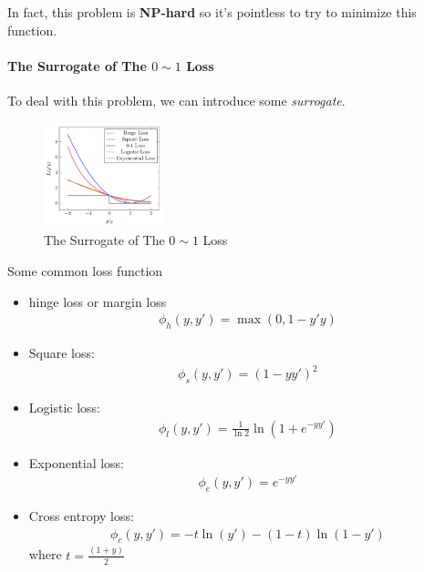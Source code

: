 In fact, this problem is \textbf{NP-hard} so it's pointless to try to minimize this function. 

\paragraph{The Surrogate of The \texorpdfstring{$0\sim 1$}. Loss}To deal with this problem, we can introduce some \textit{surrogate}. 

\begin{figure}[!htb]
    \centering
    \includegraphics[width=0.309\textwidth]{pic/Opt1/Surrogate.png}
    \caption{The Surrogate of The $0\sim 1$ Loss}
\end{figure}

Some common loss function 
\begin{itemize}
    \item hinge loss or margin loss 
    \begin{align*}
        \phi_h(y,y')=\max(0,1-y'y)
    \end{align*}
    \item Square loss: 
    \begin{align*}
        \phi_s(y,y')=(1-yy')^2
    \end{align*}
    \item Logistic loss: 
    \begin{align*}
        \phi_l(y,y')=\frac{1}{\ln 2}\ln(1+e^{-yy'})
    \end{align*}
    \item Exponential loss: 
    \begin{align*}
        \phi_e(y,y')=e^{-yy'}
    \end{align*}
    \item Cross entropy loss: 
    \begin{align*}
        \phi_c(y,y')=-t\ln(y')-(1-t)\ln(1-y')
    \end{align*}
    where $t=\frac{(1+y)}{2}$
\end{itemize}

